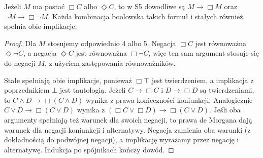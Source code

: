 \begin{lemat}
\label{lem:ncl-modal-S5-stability}
Jeżeli $M$ ma postać $\Box C$ albo $\Diamond C$,
to w S5 dowodliwe są
$M\to\Box M$ oraz $\neg M\to\Box\neg M$.
Każda kombinacja boolowska takich formuł
i stałych również spełnia obie implikacje.
\end{lemat}
\begin{proof}
Dla $M$ stosujemy odpowiednio 4 albo 5.
Negacja $\Box C$ jest równoważna $\Diamond\neg C$,
a negacja $\Diamond C$ jest równoważna
$\Box\neg C$, więc ten sam argument stosuje się
do negacji $M$, z użyciem zastępowania równoważników.

Stałe spełniają obie implikacje, ponieważ
$\Box\top$ jest twierdzeniem, a implikacja
z poprzednikiem $\bot$ jest tautologią.
Jeżeli $C\to\Box C$ i $D\to\Box D$ są
twierdzeniami, to
$C\wedge D\to\Box(C\wedge D)$ wynika
z prawa konieczności koniunkcji.
Analogicznie $C\vee D\to\Box(C\vee D)$
wynika z $(\Box C\vee\Box D)\to\Box(C\vee D)$.
Jeśli oba argumenty spełniają też warunek
dla swoich negacji, to prawa de Morgana
dają warunek dla negacji koniunkcji i alternatywy.
Negacja zamienia oba warunki (z dokładnością
do podwójnej negacji), a implikację wyrażamy
przez negację i alternatywę.
Indukcja po spójnikach kończy dowód.
\end{proof}

